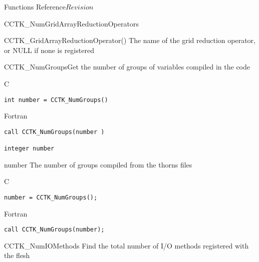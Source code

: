 \begin{cactuspart}{ Functions Reference}{}{$Revision$}
\begin{FunctionDescription}{CCTK\_NumGridArrayReductionOperators}
\begin{SeeAlsoSection}
\begin{SeeAlso}{CCTK\_GridArrayReductionOperator()}
The name of the grid reduction operator, or NULL if none is registered
\end{SeeAlso}
\end{SeeAlsoSection}
\end{FunctionDescription}


\begin{FunctionDescription}{CCTK\_NumGroups}{Get the number of groups of variables compiled in the code}
\label{CCTK-NumGroups}
\begin{SynopsisSection}
\begin{Synopsis}{C}
\begin{verbatim}int number = CCTK_NumGroups()\end{verbatim}
\end{Synopsis}
\begin{Synopsis}{Fortran}
\begin{verbatim}call CCTK_NumGroups(number )

integer number\end{verbatim}
\end{Synopsis}
\end{SynopsisSection}
\begin{ParameterSection}
\begin{Parameter}{number}
The number of groups compiled from the thorns  files
\end{Parameter}
\end{ParameterSection}

\begin{ExampleSection}
\begin{Example}{C}
\begin{verbatim}
number = CCTK_NumGroups();
\end{verbatim}
\end{Example}
\begin{Example}{Fortran}
\begin{verbatim}
call CCTK_NumGroups(number);
\end{verbatim}
\end{Example}
\end{ExampleSection}
\end{FunctionDescription}


\begin{FunctionDescription}{CCTK\_NumIOMethods}
\label{CCTK-NumIOMethods}
Find the total number of I/O methods registered with the flesh


\end{FunctionDescription}
\end{cactuspart}
